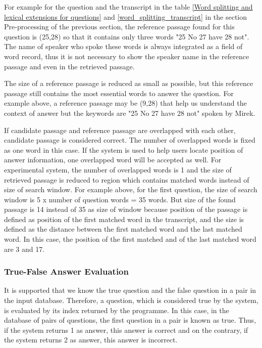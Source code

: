 \documentclass[10pt,a4paper]{article}
\numberwithin{algorithm}{section}  %
\begin{document}
For example for the question and the transcript in the table \ref{Word splitting and lexical extensions for questions} and \ref{word_splitting_transcript} in the section Pre-processing of the previous section, the reference passage found for this question is (25,28) so that it contains only three words "25 No 27 have 28 not". The name of speaker who spoke these words is always integrated as a field of word record, thus it is not necessary to show the speaker name in the reference passage and even in the retrieved passage.

The size of a reference passage is reduced as small as possible, but this reference passage still contains the most essential words to answer the question. For example above, a reference passage may be (9,28) that help us understand the context of answer but the keywords are "25 No 27 have 28 not" spoken by Mirek.

If candidate passage and reference passage are overlapped with each other, candidate passage is considered correct. The number of overlapped words is fixed as one word in this case. If the system is used to help users locate position of answer information, one overlapped word will be accepted as well. For experimental system, the number of overlapped words is 1 and the size of retrieved passage is reduced to region which contains matched words instead of size of search window. For example above, for the first question, the size of search window is 5 x number of question words = 35 words. But size of the found passage is 14 instead of 35 as size of window because position of the passage is defined as position of the first matched word in the transcript, and the size is defined as the distance between the first matched word and the last matched word. In this case, the position of the first matched and of the last matched word are 3 and 17.


\subsubsection*{True-False Answer Evaluation}

It is supported that we know the true question and the false question in a pair in the input database. Therefore, a question, which is considered true by the system, is evaluated by its index returned by the programme. In this case, in the database of pairs of questions, the first question in a pair is known as true.  Thus, if the system returns 1 as answer, this answer is correct and on the contrary, if the system returns 2 as answer, this answer is incorrect.
\end{document}
